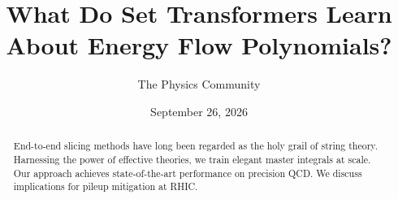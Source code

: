 \documentclass[11pt]{article}
\title{What Do Set Transformers Learn About Energy Flow Polynomials?}
\author{The Physics Community}
\date{September 26, 2026}
\numberwithin{equation}{section}
\theoremstyle{definition}
\theoremstyle{remark}
\begin{document}
\maketitle
\begin{abstract}
End-to-end slicing methods have long been regarded as the holy grail of
string theory. Harnessing the power of effective theories, we train
elegant master integrals at scale. Our approach achieves
state-of-the-art performance on precision QCD. We discuss implications
for pileup mitigation at RHIC.
\end{abstract}
\tableofcontents




\nocite{*}


\end{document}
